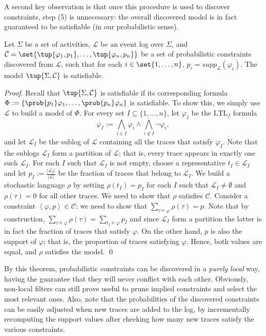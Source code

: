A second key observation is that once this procedure is used to discover \pdeclare constraints, step (5) is unnecessary: the overall discovered model is in fact guaranteed to be satisfiable (in our probabilistic sense).
%
\begin{theorem}
Let $\Sigma$ be a set of activities, $\mathcal{L}$ be an event log over $\Sigma$,
and
$\mathcal{C}=\set{\tup{\varphi_1,p_1},\ldots,\tup{\varphi_n,p_n}}$ be a set of probabilistic constraints discovered from $\mathcal{L}$, such that for each $i \in \set{1,\ldots,n}$, $p_i = \mathit{supp}_{\mathcal{L}}(\varphi_i)$.
 The \pdeclare model $\tup{\Sigma,\mathcal{C}}$ is satisfiable.
\end{theorem}
%
\begin{proof}
Recall that $\tup{\Sigma,\mathcal{C}}$ is satisfiable if its corresponding \PLTLz formula
$\Phi:=\{\prob{p_1}\varphi_1,\ldots,\prob{p_n}\varphi_n\}$ is satisfiable.
To show this, we simply use $\mathcal{L}$ to build a model of $\Phi$.
%
For every set $I\subseteq \{1,\ldots,n\}$, let
$\varphi_I$ be the $\text{LTL}_f$ formula
\[
\varphi_I := \bigwedge_{i\in I} \varphi_i \land \bigwedge_{i\notin I}\neg\varphi_i,
\]
and let $\mathcal{L}_I$ be the sublog of $\mathcal{L}$ containing all the traces that satisfy $\varphi_I$. Note
that the sublogs $\mathcal{L}_I$ form a partition of $\mathcal{L}$; that is, every trace appears in exactly one
such $\mathcal{L}_I$.
For each $I$ such that $\mathcal{L}_I$ is not empty, choose a representative $t_I\in\mathcal{L}_I$ and let
$p_I:=\frac{\vert \mathcal{L}_I \vert}{\vert \mathcal{L} \vert}$ be the fraction of traces that belong to $\mathcal{L}_I$. 
We build a stochastic language $\rho$ by setting $\rho(t_I)=p_I$ for each $I$ such that $\mathcal{L}_I\not=\emptyset$
and $\rho(\tau)=0$ for all other traces. We need to show that $\rho$ satisfies $\mathcal{C}$.
Consider a constraint $\left<\varphi,p\right>\in\mathcal{C}$; we need to show that $\sum_{\tau\models\varphi}\rho(\tau)=p$.
Note that by construction, $\sum_{\tau\models\varphi}\rho(\tau)=\sum_{t_I\models\varphi}p_I$ and
since $\mathcal{L}_I$ form a partition the latter is in fact the fraction of traces that satisfy
$\varphi$. On the other hand, $p$ is also the
support of $\varphi$; that is, the proportion of traces satisfying $\varphi$. Hence, both values are equal, and $\rho$
satisfies the \pdeclare model.
\qed
\end{proof}
By this theorem, probabilistic constraints can be discovered in a \emph{purely local} way, having the guarantee that they will never conflict with each other. Obviously, non-local filters can still prove useful to prune implied constraints and select the most relevant ones.
Also, note that the probabilities of the discovered constraints can be easily adjusted when new traces are added to the log, by incrementally recomputing the support values after checking how many new traces satisfy the various constraints.

